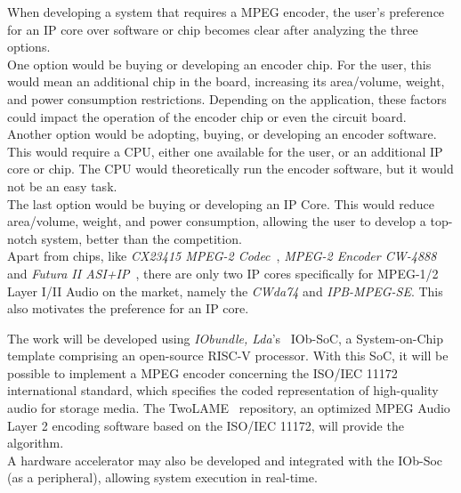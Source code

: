 When developing a system that requires a MPEG encoder, the user's preference for an IP core over software or chip becomes clear after analyzing the three options.\\
One option would be buying or developing an encoder chip. For the user, this would mean an additional chip in the board, increasing its area/volume, weight, and power consumption restrictions. Depending on the application, these factors could impact the operation of the encoder chip or even the circuit board.\\
Another option would be adopting, buying, or developing an encoder software. This would require a CPU, either one available for the user, or an additional IP core or chip. The CPU would theoretically run the encoder software, but it would not be an easy task.\\
The last option would be buying or developing an IP Core. This would reduce area/volume, weight, and power consumption, allowing the user to develop a top-notch system, better than the competition.\\
Apart from chips, like \textit{CX23415 MPEG-2 Codec}~\cite{cx23415}, \textit{MPEG-2 Encoder CW-4888}~\cite{cw4888} and \textit{Futura II ASI+IP}~\cite{futura}, there are only two IP cores specifically for MPEG-1/2 Layer I/II Audio on the market, namely the \textit{CWda74} and \textit{IPB-MPEG-SE}. This also motivates the preference for an IP core.

The work will be developed using \textit{IObundle, Lda}'s~\cite{iobundle} IOb-SoC, a System-on-Chip template comprising an open-source RISC-V processor. 
With this SoC, it will be possible to implement a MPEG encoder concerning the ISO/IEC 11172 international standard, which specifies the coded representation of high-quality audio for storage media. The TwoLAME~\cite{twolame} repository, an optimized MPEG Audio Layer 2 encoding software based on the ISO/IEC 11172, will provide the algorithm.\\
A hardware accelerator may also be developed and integrated with the IOb-Soc (as a peripheral), allowing system execution in real-time.

